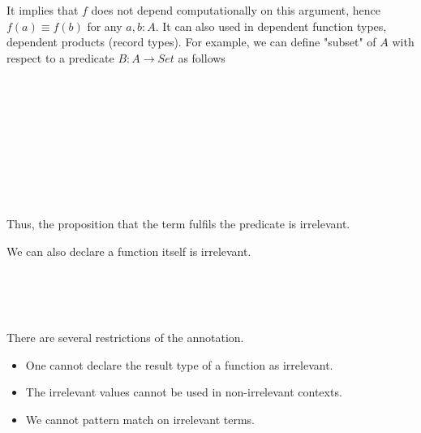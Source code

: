 It implies that $f$ does not depend computationally on this argument, hence $f(a) \equiv f(b)$ for any $a, b : A$. It can also used in dependent function types, dependent products (record types). 
For example, we can define "subset" of $A$ with respect to a predicate $B : A \to Set$ as follows

\begin{code}\>\<%
\\
\>  \AgdaSymbol{\{} \AgdaSymbol{\}} \AgdaSymbol{(} \AgdaSymbol{:}  \AgdaSymbol{)} \<[32]%
\>[32]\<%
\\
\>[2]\<[7]%
\>[7]\AgdaSymbol{(} \AgdaSymbol{:}    \AgdaSymbol{)} \AgdaSymbol{:}  \AgdaSymbol{(}  \AgdaSymbol{)} \<%
\\
\>[0]\<[2]%
\>[2] \AgdaInductiveConstructor{\_,\_}\<%
\\
\>[0]\<[2]%
\>[2]\<%
\\
\>[2]\<[4]%
\>[4] \AgdaSymbol{:} \<%
\\
\>[2]\<[4]%
\>[4] \AgdaSymbol{:}  \<%
\\
\>  \<%
\\
\>\<\end{code}

Thus, the proposition that the term fulfils the predicate is irrelevant. 

We can also declare a function itself is irrelevant.

\begin{code}
%
\\
\> \AgdaSymbol{:}   \<%
\\
\>  \AgdaSymbol{=} \<%
\\
\end{code}

There are several restrictions of the annotation.

\begin{itemize}

 \item One cannot declare the result type of a function as irrelevant. 

 \item The irrelevant values cannot be used in non-irrelevant contexts.

 \item We cannot pattern match on irrelevant terms. 
\end{itemize}

